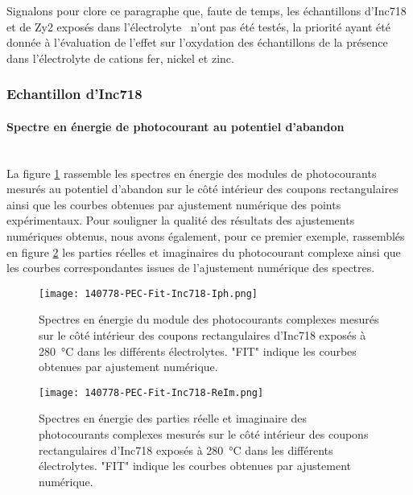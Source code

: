 \begin{refsection}
    Signalons pour clore ce paragraphe que, faute de temps,
    les échantillons d’Inc718 et de Zy2 exposés dans l’électrolyte
    \NaSO\ n’ont pas été testés, la priorité ayant été donnée à l’évaluation
    de l’effet sur l’oxydation des échantillons de la présence dans l’électrolyte
    de cations fer, nickel et zinc.

    \subsubsection{Echantillon d'Inc718}\label{subsubsec:Inc718_samples}

    \paragraph{Spectre en énergie de photocourant au potentiel d'abandon}\label{parg:OCV_Iph}
    \mbox{}\\
    La figure \ref{fig:ch4_OCV_Iph_718} rassemble les spectres en énergie des modules de photocourants mesurés 
    au potentiel d’abandon sur le côté intérieur des coupons rectangulaires ainsi que les
    courbes obtenues par ajustement numérique des points expérimentaux. Pour souligner
    la qualité des résultats des ajustements numériques obtenus, nous avons également, 
    pour ce premier exemple, rassemblés en figure \ref{fig:ch4_OCV_ReImIph_718} les parties réelles et imaginaires 
    du photocourant complexe ainsi que les courbes correspondantes issues de l’ajustement 
    numérique des spectres.

    \begin{figure}[H]
        \centering
        \texttt{[image: 140778-PEC-Fit-Inc718-Iph.png]}
        \caption{Spectres en énergie du module des photocourants complexes 
            mesurés sur le côté intérieur des coupons rectangulaires d’Inc718
            exposés à \SI{280}{\degreeCelsius} dans les différents électrolytes. "FIT" indique 
        les courbes obtenues par ajustement numérique.}
        \label{fig:ch4_OCV_Iph_718}
    \end{figure}


    \begin{figure}[H]
        \centering
        \texttt{[image: 140778-PEC-Fit-Inc718-ReIm.png]}
        \caption{Spectres en énergie des parties réelle et imaginaire des photocourants complexes mesurés sur le côté
            intérieur des coupons rectangulaires d’Inc718 exposés à \SI{280}{\degreeCelsius} dans les différents électrolytes. "FIT"
        indique les courbes obtenues par ajustement numérique.}
        \label{fig:ch4_OCV_ReImIph_718}
    \end{figure}


\end{refsection}
